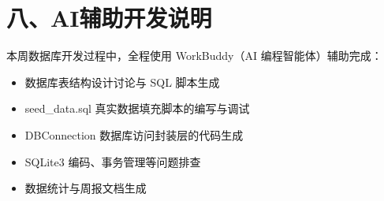 \documentclass[12pt,a4paper]{article}
\begin{document}
\section*{八、AI辅助开发说明}

本周数据库开发过程中，全程使用 WorkBuddy（AI 编程智能体）辅助完成：
\begin{itemize}[leftmargin=2em]
    \item 数据库表结构设计讨论与 SQL 脚本生成
    \item seed\_data.sql 真实数据填充脚本的编写与调试
    \item DBConnection 数据库访问封装层的代码生成
    \item SQLite3 编码、事务管理等问题排查
    \item 数据统计与周报文档生成
\end{itemize}
\end{document}
